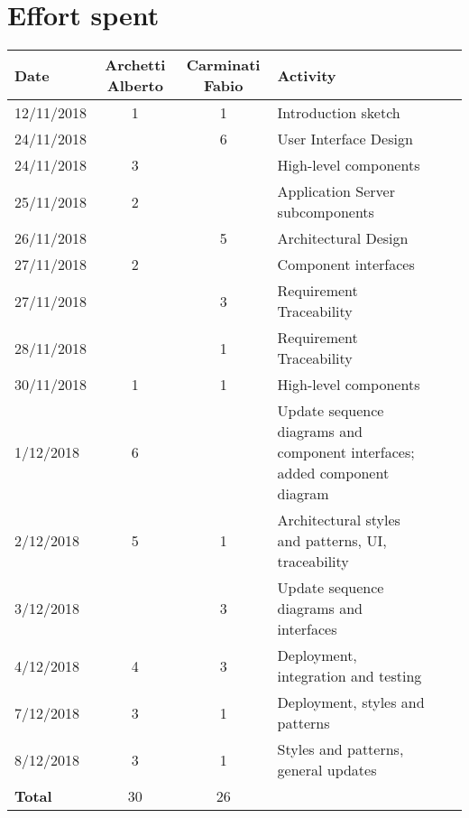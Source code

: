 \documentclass[../DD0.tex]{subfiles}
\newcommand{\addHours}[4]{#1 & #2 & #3 & #4 \\\hline}
\begin{document}
\section*{Effort spent}
\label{sec:effort}
  \begin{table}[h!]
  \centering
  \begin{tabularx}{\linewidth}{|l|c|c|X|Xl}
    \hline
    \textbf{Date}  & \textbf{Archetti Alberto} & \textbf{Carminati Fabio} & \textbf{Activity} \\ \hline

    \addHours{12/11/2018}{1}{1}{Introduction sketch}

    \addHours{24/11/2018}{}{6}{User Interface Design}

    \addHours{24/11/2018}{3}{}{High-level components}

    \addHours{25/11/2018}{2}{}{Application Server subcomponents}

    \addHours{26/11/2018}{}{5}{Architectural Design}

    \addHours{27/11/2018}{2}{}{Component interfaces}

    \addHours{27/11/2018}{}{3}{Requirement Traceability}

    \addHours{28/11/2018}{}{1}{Requirement Traceability}

    \addHours{30/11/2018}{1}{1}{High-level components}

    \addHours{1/12/2018}{6}{}{Update sequence diagrams and component interfaces; added component diagram}

    \addHours{2/12/2018}{5}{1}{Architectural styles and patterns, UI, traceability}

    \addHours{3/12/2018}{}{3}{Update sequence diagrams and interfaces}

    \addHours{4/12/2018}{4}{3}{Deployment, integration and testing}

    \addHours{7/12/2018}{3}{1}{Deployment, styles and patterns}

    \addHours{8/12/2018}{3}{1}{Styles and patterns, general updates}

    \addHours{\textbf{Total}}{30}{26}{}
    
  \end{tabularx}
\end{table}
\end{document}

